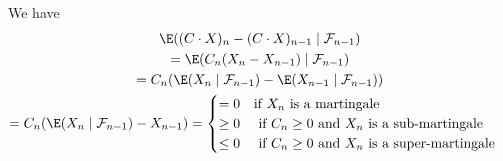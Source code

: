 \par\bigskip
\begin{prf}[]{}
  We have 
  \begin{equation*}
    \begin{gathered}
      \E((C\cdot X)_n-(C\cdot X)_{n-1}\mid\mathcal{F}_{n-1})\\
      = \E(C_n(X_n-X_{n-1})\mid\mathcal{F}_{n-1})\\
      = C_n(\E(X_n\mid\mathcal{F}_{n-1})-\E(X_{n-1}\mid\mathcal{F}_{n-1}))\\
      = C_n(\E(X_n\mid\mathcal{F}_{n-1})-X_{n-1}) = \begin{cases}=0\quad\text{if $X_n$ is a martingale}\\\geq0\quad\text{ if $C_n\geq0$ and $X_n$ is a sub-martingale}\\\leq0\quad\text{ if $C_n\geq0$ and $X_n$ is a super-martingale}\end{cases}
    \end{gathered}
  \end{equation*}
\end{prf}
